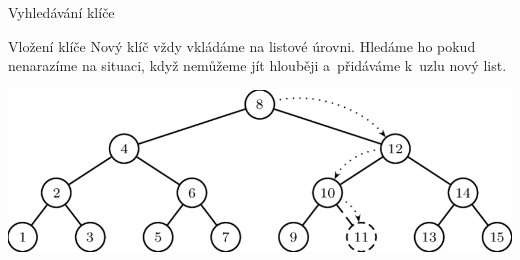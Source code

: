 \documentclass[10pt]{beamer}
\begin{document}
\begin{frame}[t]{Vyhledávání klíče}
{\begin{center}
    \end{center}
    }
\end{frame}

\begin{frame}[t]{Vložení klíče}
    \bigskip
    Nový klíč vždy vkládáme na listové úrovni. Hledáme ho pokud nenarazíme na situaci, když nemůžeme jít hlouběji a~přidáváme k~uzlu nový list.
    \bigskip
    \begin{center}
        \includegraphics[scale=0.35]{strom.png}
    \end{center}
\end{frame}
\end{document}
